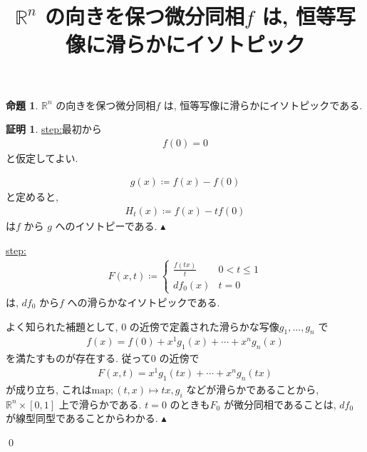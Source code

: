 \documentclass[10pt, fleqn, label-section=none]{bxjsarticle}
\title{$\mathbb R ^n$ の向きを保つ微分同相$f$ は, 恒等写像に滑らかにイソトピック}
\date{}
\author{}
\theoremstyle{definition}
\newtheorem{prop}[dfn]{命題}
\newtheorem*{pf*}{証明}
\newcommand{\cbra}[1]{\mleft\{#1\mright\}}
\renewcommand{\;}{\, ; \,}
\newenvironment{claim}[1]{\par\noindent\underline{step:}\space#1}{}
\newenvironment{claimproof}[1]{\par\noindent{($\because$)}\space#1}{\hfill $\blacktriangle $}
\begin{document}
\maketitle

\section{}

\begin{prop}
$\mathbb R ^n$ の向きを保つ微分同相$f$ は, 恒等写像に滑らかにイソトピックである.
\end{prop}
\begin{pf*}

\begin{claim}最初から
\begin{align*} f(0) = 0 \end{align*}
と仮定してよい. 
\end{claim}
\begin{claimproof}
\begin{align*} g(x) \coloneqq f(x) - f(0) \end{align*}
と定めると, 
\begin{align*} H_t(x) \coloneqq f(x) - t f(0) \end{align*}
は$f$ から $g$ へのイソトピーである. 
\end{claimproof}

\begin{claim}
\begin{align*} F(x, t) \coloneqq \begin{cases} \frac{f(tx)}{t} & 0 < t \leq 1 \\ df_0 (x) & t = 0 \end{cases}\end{align*}
は, $df_0$ から$f$ への滑らかなイソトピックである. 
\end{claim}
\begin{claimproof}
よく知られた補題として, $0$ の近傍で定義された滑らかな写像$g_1, \ldots , g_n$ で
\begin{align*} f(x) = f(0) + x^1 g_1(x) + \cdots + x^n g_n (x)\end{align*}
を満たすものが存在する. 従って$0$ の近傍で
\begin{align*} F(x, t) = x^1 g_1(tx) + \cdots + x^n g_n (tx)\end{align*}
が成り立ち, これは$\textrm{map};(t,x) \mapsto tx, g_i$ などが滑らかであることから, $\mathbb R^n \times [0, 1]$ 上で滑らかである. $t = 0$ のときも$F_0$ が微分同相であることは, $df_0$ が線型同型であることからわかる. 
\end{claimproof}


\qed
\end{pf*}
\end{document}
